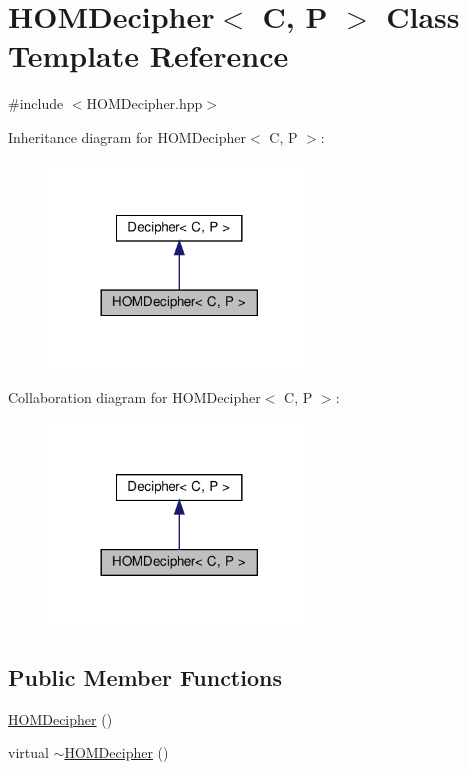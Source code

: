 \hypertarget{classHOMDecipher}{}\section{H\+O\+M\+Decipher$<$ C, P $>$ Class Template Reference}
\label{classHOMDecipher}


{\ttfamily \#include $<$H\+O\+M\+Decipher.\+hpp$>$}



Inheritance diagram for H\+O\+M\+Decipher$<$ C, P $>$\+:\nopagebreak
\begin{figure}[H]
\begin{center}
\leavevmode
\includegraphics[width=197pt]{classHOMDecipher__inherit__graph}
\end{center}
\end{figure}


Collaboration diagram for H\+O\+M\+Decipher$<$ C, P $>$\+:\nopagebreak
\begin{figure}[H]
\begin{center}
\leavevmode
\includegraphics[width=197pt]{classHOMDecipher__coll__graph}
\end{center}
\end{figure}
\subsection*{Public Member Functions}
\begin{DoxyCompactItemize}
\item 
\hyperlink{classHOMDecipher_ab98e34714b534c4e02d08d952befa62b}{H\+O\+M\+Decipher} ()
\item 
virtual \hyperlink{classHOMDecipher_ae9f58f01719a48d5bbd41824181e181a}{$\sim$\+H\+O\+M\+Decipher} ()
\end{DoxyCompactItemize}
